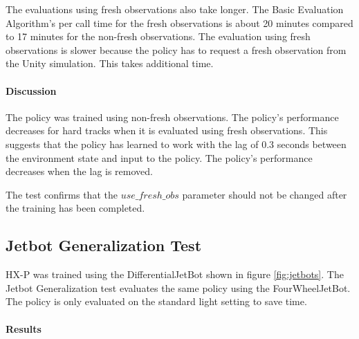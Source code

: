 The evaluations using fresh observations also take longer. The Basic Evaluation Algorithm's per call time for the fresh observations is about 20 minutes compared to 17 minutes for the non-fresh observations. The evaluation using fresh observations is slower because the policy has to request a fresh observation from the Unity simulation. This takes additional time.


\paragraph{Discussion}

The policy was trained using non-fresh observations. The policy's performance decreases for hard tracks when it is evaluated using fresh observations.
This suggests that the policy has learned to work with the lag of 0.3 seconds between the environment state and input to the policy. The policy's performance decreases when the lag is removed.

The test confirms that the $use\_fresh\_obs$ parameter should not be changed after the training has been completed.


\subsection{Jetbot Generalization Test}

\ac{HX-P} was trained using the DifferentialJetBot shown in figure \ref{fig:jetbots}. The Jetbot Generalization test evaluates the same policy using the FourWheelJetBot. The policy is only evaluated on the standard light setting to save time.

\paragraph{Results}

